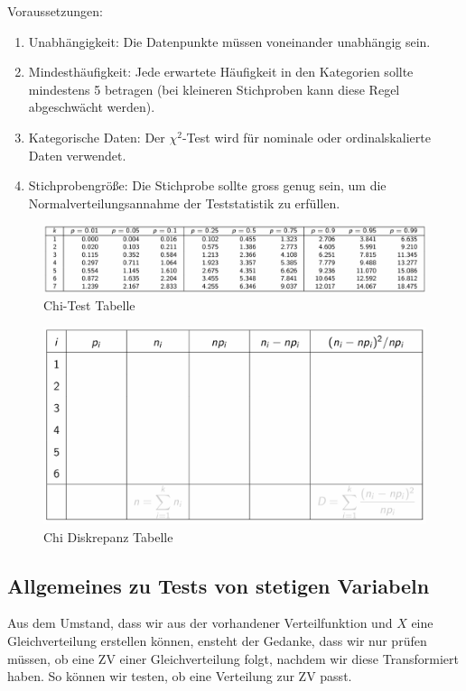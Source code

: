 \documentclass[../Main.tex]{subfiles}
\begin{document}
Voraussetzungen:
\begin{enumerate}
    \item Unabhängigkeit: Die Datenpunkte müssen voneinander unabhängig sein.
    \item Mindesthäufigkeit: Jede erwartete Häufigkeit in den Kategorien sollte mindestens 5 betragen (bei kleineren Stichproben kann diese Regel abgeschwächt werden).
    \item Kategorische Daten: Der \(\chi^2\)-Test wird für nominale oder ordinalskalierte Daten verwendet.
    \item Stichprobengröße: Die Stichprobe sollte gross genug sein, um die Normalverteilungsannahme der Teststatistik zu erfüllen.
\end{enumerate}

\begin{figure}[H]
    \centering
    \includegraphics[width=1\linewidth]{Images/x-test-tabelle.png}
    \caption{Chi-Test Tabelle}
\end{figure}

\begin{figure}[H]
    \centering
    \includegraphics[width=1\linewidth]{Images/diskrepanz-tabelle.png}
    \caption{Chi Diskrepanz Tabelle}
\end{figure}

\subsection{Allgemeines zu Tests von stetigen Variabeln}
Aus dem Umstand, dass wir aus der vorhandener Verteilfunktion und \(X\)
eine Gleichverteilung erstellen können, ensteht der Gedanke, dass wir
nur prüfen müssen, ob eine ZV einer Gleichverteilung folgt, nachdem wir diese Transformiert haben.
So können wir testen, ob eine Verteilung zur ZV passt.
\end{document}
